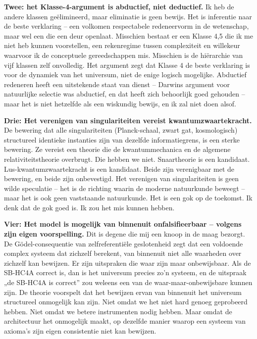 \documentclass[11pt, twoside, openright]{book}
\begin{document}
\textbf{Twee: het Klasse-4-argument is abductief, niet deductief.} Ik heb de andere klassen geëlimineerd, maar eliminatie is geen bewijs. Het is inferentie naar de beste verklaring -- een volkomen respectabele redeneervorm in de wetenschap, maar wel een die een deur openlaat. Misschien bestaat er een Klasse 4,5 die ik me niet heb kunnen voorstellen, een rekenregime tussen complexiteit en willekeur waarvoor ik de conceptuele gereedschappen mis. Misschien is de hiërarchie van vijf klassen zelf onvolledig. Het argument zegt dat Klasse 4 de beste verklaring is voor de dynamiek van het universum, niet de enige logisch mogelijke. Abductief redeneren heeft een uitstekende staat van dienst -- Darwins argument voor natuurlijke selectie was abductief, en dat heeft zich behoorlijk goed gehouden -- maar het is niet hetzelfde als een wiskundig bewijs, en ik zal niet doen alsof.

\textbf{Drie: Het verenigen van singulariteiten vereist kwantumzwaartekracht.} De bewering dat alle singulariteiten (Planck-schaal, zwart gat, kosmologisch) structureel identieke instanties zijn van dezelfde informatiegrens, is een sterke bewering. Ze vereist een theorie die de kwantummechanica en de algemene relativiteitstheorie overbrugt. Die hebben we niet. Snaartheorie is een kandidaat. Lus-kwantumzwaartekracht is een kandidaat. Beide zijn verenigbaar met de bewering, en beide zijn onbevestigd. Het verenigen van singulariteiten is geen wilde speculatie -- het is de richting waarin de moderne natuurkunde beweegt -- maar het is ook geen vaststaande natuurkunde. Het is een gok op de toekomst. Ik denk dat de gok goed is. Ik zou het mis kunnen hebben.

\textbf{Vier: Het model is mogelijk van binnenuit onfalsifieerbaar -- volgens zijn eigen voorspelling.} Dit is degene die mij een knoop in de maag bezorgt. De Gödel-consequentie van zelfreferentiële geslotenheid zegt dat een voldoende complex systeem dat zichzelf berekent, van binnenuit niet alle waarheden over zichzelf kan bewijzen. Er zijn uitspraken die waar zijn maar onbewijsbaar. Als de SB-HC4A correct is, dan is het universum precies zo'n systeem, en de uitspraak „de SB-HC4A is correct” zou weleens een van de waar-maar-onbewijsbare kunnen zijn. De theorie voorspelt dat het bewijzen ervan van binnenuit het universum structureel onmogelijk kan zijn. Niet omdat we het niet hard genoeg geprobeerd hebben. Niet omdat we betere instrumenten nodig hebben. Maar omdat de architectuur het onmogelijk maakt, op dezelfde manier waarop een systeem van axioma's zijn eigen consistentie niet kan bewijzen.
\end{document}
